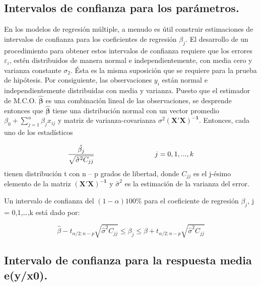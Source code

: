 \documentclass[
]{book}
\begin{document}
\hypertarget{intervalos-de-confianza-para-los-paruxe1metros.}{%
\subsection{Intervalos de confianza para los parámetros.}\label{intervalos-de-confianza-para-los-paruxe1metros.}}

En los modelos de regresión múltiple, a menudo es útil construir estimaciones de intervalos de confianza para los coeficientes de regresión \(\beta_{j}\). El desarrollo de un procedimiento para obtener estos intervalos de confianza requiere que los errores \(\varepsilon_{i}\), estén distribuidos de manera normal e independientemente, con media cero y varianza constante \(\sigma_{2}\). Ésta es la misma suposición que se requiere para la prueba de hipótesis. Por consiguiente, las observaciones \(y_{i}\) están normal e independientemente distribuidas con media y varianza. Puesto que el estimador de M.C.O. \(\boldsymbol{\hat{\beta}}\) es una combinación lineal de las observaciones, se desprende entonces que \(\boldsymbol{\hat{\beta}}\) tiene una distribución normal con un vector promedio \(\beta_{0}+\sum_{j=1}^{n}\beta_{j}x_{ij}\) y matriz de varianza-covarianza \(\sigma^{2}\boldsymbol{(X'X)^{-1}}\). Entonces, cada uno de los estadísticos

\[
\frac{\hat{\beta_{j}}}{\sqrt{\hat{\sigma}^{2}C_{jj}}}
\hspace{3.0cm}j = 0,1,...,k
\] tienen distribución t con n -- p grados de libertad, donde \(C_{jj}\) es el j-ésimo elemento de la matriz \(\boldsymbol{(X'X)^{-1}}\) y \(\hat{\sigma}^{2}\) es la estimación de la varianza del error.

Un intervalo de confianza del \((1-\alpha)100\)\% para el coeficiente de regresión \(\beta_{j}\), j = 0,1,\ldots,k está dado por:

\[
\begin{equation}
\hat{\beta}-t_{\alpha/2;n-p}\sqrt{\hat{\sigma}^{2}C_{jj}}\leq \beta_{j}\leq\hat{\beta}+t_{\alpha/2;n-p}\sqrt{\hat{\sigma}^{2}C_{jj}}
\end{equation}
\]

\hypertarget{intervalo-de-confianza-para-la-respuesta-media-eyx0.}{%
\subsection{Intervalo de confianza para la respuesta media e(y/x0).}\label{intervalo-de-confianza-para-la-respuesta-media-eyx0.}}
\end{document}
